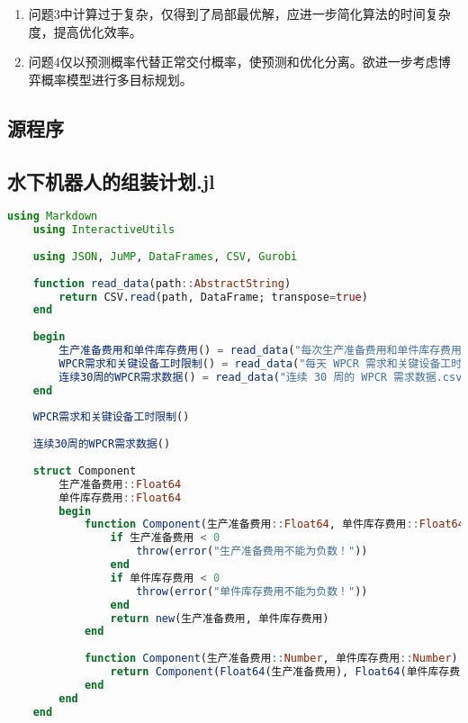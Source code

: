 \begin{enumerate}
    \item 问题3中计算过于复杂，仅得到了局部最优解，应进一步简化算法的时间复杂度，提高优化效率。
    \item 问题4仅以预测概率代替正常交付概率，使预测和优化分离。欲进一步考虑博弈概率模型进行多目标规划。
\end{enumerate}




\printbibliography
\newpage
\begin{appendices}

\section{源程序}


\subsection{水下机器人的组装计划.jl} %
\begin{lstlisting}[language=julia]
    using Markdown
    using InteractiveUtils
    
    using JSON, JuMP, DataFrames, CSV, Gurobi
    
    function read_data(path::AbstractString)
        return CSV.read(path, DataFrame; transpose=true)
    end
    
    begin
        生产准备费用和单件库存费用() = read_data("每次生产准备费用和单件库存费用.csv")
        WPCR需求和关键设备工时限制() = read_data("每天 WPCR 需求和关键设备工时限制.csv")
        连续30周的WPCR需求数据() = read_data("连续 30 周的 WPCR 需求数据.csv")
    end
    
    WPCR需求和关键设备工时限制()
    
    连续30周的WPCR需求数据()
    
    struct Component
        生产准备费用::Float64
        单件库存费用::Float64
        begin
            function Component(生产准备费用::Float64, 单件库存费用::Float64)
                if 生产准备费用 < 0
                    throw(error("生产准备费用不能为负数！"))
                end
                if 单件库存费用 < 0
                    throw(error("单件库存费用不能为负数！"))
                end
                return new(生产准备费用, 单件库存费用)
            end
    
            function Component(生产准备费用::Number, 单件库存费用::Number)
                return Component(Float64(生产准备费用), Float64(单件库存费用))
            end
        end
    end
    

\end{lstlisting}
\end{appendices}
